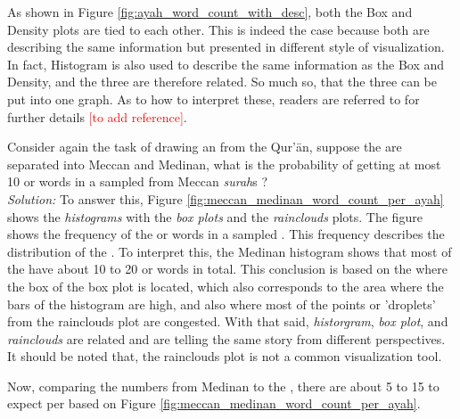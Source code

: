 As shown in Figure \ref{fig:ayah_word_count_with_desc}, both the Box and Density plots are tied to each other. This is indeed the case because both are describing the same information but presented in different style of visualization. In fact, Histogram is also used to describe the same information as the Box and Density, and the three are therefore related. So much so, that the three can be put into one graph. As to how to interpret these, readers are referred to for further details \textcolor{red}{[to add reference]}.
\begin{exmpx}\label{ex:frequency_distribution}
Consider again the task of drawing an   from the Qur'\=an, suppose the   are separated into  Meccan and  Medinan, what is the probability of getting at most 10   or words in a sampled   from  Meccan \textit{surah}s ?\\
\textit{Solution:} To answer this, Figure \ref{fig:meccan_medinan_word_count_per_ayah} shows the \textit{histograms} with the \textit{box plots} and the \textit{rainclouds} plots. The figure shows the frequency of the   or words in a sampled  . This frequency describes the distribution of the  . To interpret this, the Medinan  histogram shows that most of the   have about 10 to 20   or words in total. This conclusion is based on the where the box of the box plot is located, which also corresponds to the area where the bars of the histogram are high, and also where most of the points or 'droplets' from the rainclouds plot are congested. With that said, \textit{historgram}, \textit{box plot}, and \textit{rainclouds} are related and are telling the same story from different perspectives. It should be noted that, the rainclouds plot is not a common visualization tool. 

Now, comparing the numbers from Medinan  to the  , there are about 5 to 15   to expect per   based on Figure \ref{fig:meccan_medinan_word_count_per_ayah}. 


\end{exmpx}
